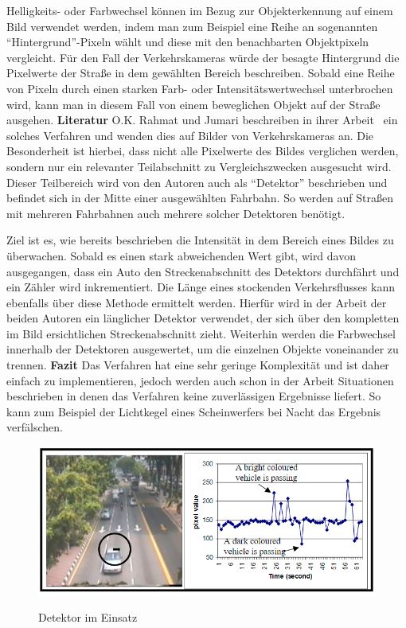 Helligkeits- oder Farbwechsel können im Bezug zur Objekterkennung auf einem Bild verwendet werden, indem man zum Beispiel eine Reihe an sogenannten "`Hintergrund"'-Pixeln wählt und diese mit den benachbarten Objektpixeln vergleicht.
Für den Fall der Verkehrskameras würde der besagte Hintergrund die Pixelwerte der Straße in dem gewählten Bereich beschreiben.
Sobald eine Reihe von Pixeln durch einen starken Farb- oder Intensitätswertwechsel unterbrochen wird, kann man in diesem Fall von einem beweglichen Objekt auf der Straße ausgehen.\newline\newline
\textbf{Literatur}\newline
O.K. Rahmat und Jumari beschreiben in ihrer Arbeit~\cite{bin2001vehicle} ein solches Verfahren und wenden dies auf Bilder von Verkehrskameras an. 
Die Besonderheit ist hierbei, dass nicht alle Pixelwerte des Bildes verglichen werden, sondern nur ein relevanter Teilabschnitt zu Vergleichszwecken ausgesucht wird. 
Dieser Teilbereich wird von den Autoren auch als "`Detektor"' beschrieben und befindet sich in der Mitte einer ausgewählten Fahrbahn. 
So werden auf Straßen mit mehreren Fahrbahnen auch mehrere solcher Detektoren benötigt.

Ziel ist es, wie bereits beschrieben die Intensität in dem Bereich eines Bildes zu überwachen. 
Sobald es einen stark abweichenden Wert gibt, wird davon ausgegangen, dass ein Auto den Streckenabschnitt des Detektors durchfährt und ein Zähler wird inkrementiert.
Die Länge eines stockenden Verkehrsflusses kann ebenfalls über diese Methode ermittelt werden. 
Hierfür wird in der Arbeit der beiden Autoren ein länglicher Detektor verwendet, der sich über den kompletten im Bild ersichtlichen Streckenabschnitt zieht.
Weiterhin werden die Farbwechsel innerhalb der Detektoren ausgewertet, um die einzelnen Objekte voneinander zu trennen.
\newline\newline
\textbf{Fazit}\newline
Das Verfahren hat eine sehr geringe Komplexität und ist daher einfach zu implementieren, jedoch werden auch schon in der Arbeit Situationen beschrieben in denen das Verfahren keine zuverlässigen Ergebnisse liefert. 
So kann zum Beispiel der Lichtkegel eines Scheinwerfers bei Nacht das Ergebnis verfälschen.
\begin{figure}[ht]
   \centering
     \includegraphics[width=15cm]{Bilder/pixelanalysis} \\
 \caption{Detektor im Einsatz}
 \label{fig:Pixelanalysis}
\end{figure}
\newpage
